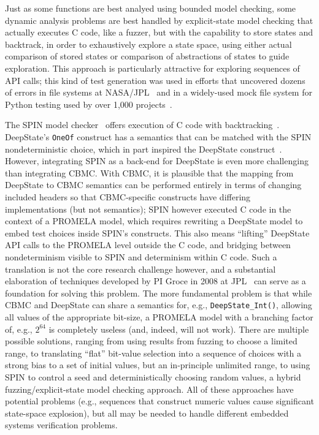 Just as some functions are best analyed using bounded model checking, some dynamic analysis problems are best handled by explicit-state model checking that actually executes C code, like a fuzzer, but with the capability to store states and backtrack, in order to exhaustively explore a state space, using either actual comparison of stored states or comparison of abstractions of states to guide exploration.  This approach is particularly attractive for exploring sequences of API calls; this kind of test generation was used in efforts that uncovered dozens of errors in file systems at NASA/JPL~\cite{AMAI} and in a widely-used mock file system for Python testing used by over 1,000 projects~\cite{tstl}.

The SPIN model checker~\cite{SPIN} offers execution of C code with backtracking~\cite{ModelDriven,ModelCode}.  DeepState's {\tt OneOf} construct has a semantics that can be matched with the SPIN nondeterministic choice, which in part inspired the DeepState construct~\cite{WODA08,WODACommon}.  However, integrating SPIN as a back-end for DeepState is even more challenging than integrating CBMC.  With CBMC, it is plausible that the mapping from DeepState to CBMC semantics can be performed entirely in terms of changing included headers so that CBMC-specific constructs have differing implementations (but not semantics); SPIN however executed C code in the context of a PROMELA model, which requires rewriting a DeepState model to embed test choices inside SPIN's constructs.  This also means ``lifting'' DeepState API calls to the PROMELA level outside the C code, and bridging between nondeterminism visible to SPIN and determinism within C code.  Such a translation is not the core research challenge however, and a substantial elaboration of techniques developed by PI Groce in 2008 at JPL~\cite{WODA08} can serve as a foundation for solving this problem.  The more fundamental problem is that while CBMC and DeepState can share a semantics for, e.g., {\tt DeepState\_Int()}, allowing all values of the appropriate bit-size, a PROMELA model with a branching factor of, e.g., $2^{64}$ is completely useless (and, indeed, will not work).  There are multiple possible solutions, ranging from using results from fuzzing to choose a limited range, to translating ``flat'' bit-value selection into a sequence of choices with a strong bias to a set of initial values, but an in-principle unlimited range, to using SPIN to control a seed and deterministically choosing random values, a hybrid fuzzing/explicit-state model checking approach.  All of these approaches have potential problems (e.g., sequences that construct numeric values cause significant state-space explosion), but all may be needed to handle different embedded systems verification problems.